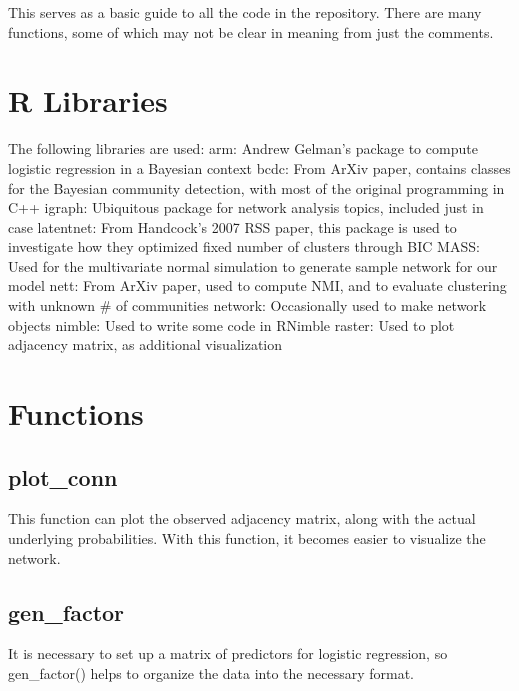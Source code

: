 




This serves as a basic guide to all the code in the repository. There are many functions, some of which may not be clear in meaning from just the comments. 

\section{R Libraries}
The following libraries are used:
\newline arm: Andrew Gelman's package to compute logistic regression in a Bayesian context
\newline bcdc: From ArXiv paper, contains classes for the Bayesian community detection, with most of the original programming in C++
\newline igraph: Ubiquitous package for network analysis topics, included just in case
\newline latentnet: From Handcock's 2007 RSS paper, this package is used to investigate how they optimized fixed number of clusters through BIC
\newline MASS: Used for the multivariate normal simulation to generate sample network for our model
\newline nett: From ArXiv paper, used to compute NMI, and to evaluate clustering with unknown # of communities
\newline network: Occasionally used to make network objects
\newline nimble: Used to write some code in RNimble
\newline raster: Used to plot adjacency matrix, as additional visualization
\section{Functions}
\subsection*{plot_conn}
This function can plot the observed adjacency matrix, along with the actual underlying probabilities. With this function, it becomes easier to visualize the network.
\subsection*{gen_factor}
It is necessary to set up a matrix of predictors for logistic regression, so gen_factor() helps to organize the data into the necessary format.
